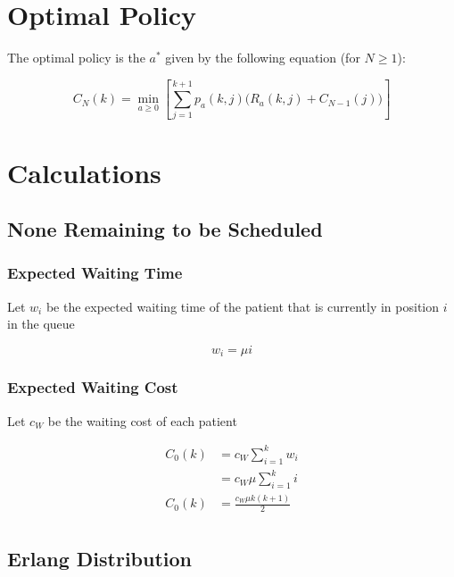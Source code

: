 \documentclass{article}
\begin{document}
\section{Optimal Policy}

The optimal policy is the $a^{*}$ given by the following equation (for $N \geq 1$):

\begin{equation}
	C_{N} (k) = \min_{a \geq 0} \left[ \sum_{j = 1}^{k + 1} p_{a} (k, j) \Big( R_{a} (k, j) + C_{N - 1} (j) \Big) \right]
\end{equation}

\section{Calculations}

\subsection{None Remaining to be Scheduled}

\subsubsection{Expected Waiting Time}

Let $w_{i}$ be the expected waiting time of the patient that is currently in position $i$ in the queue

\begin{equation*}
	w_{i} = \mu i
\end{equation*}

\subsubsection{Expected Waiting Cost}

Let $c_{W}$ be the waiting cost of each patient

\begin{align*}
	C_{0} (k) & = c_{W} \sum_{i = 1}^{k} w_{i} \\
	& = c_{W} \mu \sum_{i = 1}^{k} i \\
	C_{0} (k) & = \frac{c_{W} \mu k (k + 1)}{2} \\
\end{align*}

\subsection{Erlang Distribution}
\end{document}
